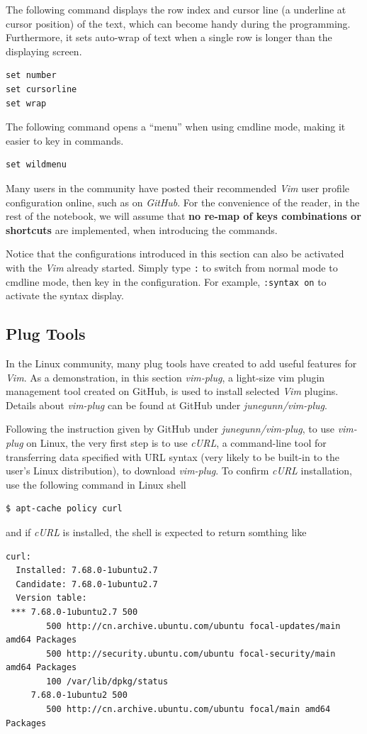 The following command displays the row index and cursor line (a underline at cursor position) of the text, which can become handy during the programming. Furthermore, it sets auto-wrap of text when a single row is longer than the displaying screen.
\begin{lstlisting}
set number
set cursorline
set wrap
\end{lstlisting}

The following command opens a ``menu'' when using cmdline mode, making it easier to key in commands.
\begin{lstlisting}
set wildmenu
\end{lstlisting}

Many users in the community have posted their recommended \textit{Vim} user profile configuration online, such as on \textit{GitHub}. For the convenience of the reader, in the rest of the notebook, we will assume that \textbf{no re-map of keys combinations or shortcuts} are implemented, when introducing the commands.

Notice that the configurations introduced in this section can also be activated with the \textit{Vim} already started. Simply type \verb|:| to switch from normal mode to cmdline mode, then key in the configuration. For example, \verb|:syntax on| to activate the syntax display.

\subsection{Plug Tools}

In the Linux community, many plug tools have created to add useful features for \textit{Vim}. As a demonstration, in this section \textit{vim-plug}, a light-size vim plugin management tool created on GitHub, is used to install selected \textit{Vim} plugins. Details about \textit{vim-plug} can be found at GitHub under \textit{junegunn/vim-plug}.

Following the instruction given by GitHub under \textit{junegunn/vim-plug}, to use \textit{vim-plug} on Linux, the very first step is to use \textit{cURL}, a command-line tool for transferring data specified with URL syntax (very likely to be built-in to the user's Linux distribution), to download \textit{vim-plug}. To confirm \textit{cURL} installation, use the following command in Linux shell
\begin{lstlisting}
$ apt-cache policy curl
\end{lstlisting}
and if \textit{cURL} is installed, the shell is expected to return somthing like
\begin{lstlisting}
curl:
  Installed: 7.68.0-1ubuntu2.7
  Candidate: 7.68.0-1ubuntu2.7
  Version table:
 *** 7.68.0-1ubuntu2.7 500
        500 http://cn.archive.ubuntu.com/ubuntu focal-updates/main amd64 Packages
        500 http://security.ubuntu.com/ubuntu focal-security/main amd64 Packages
        100 /var/lib/dpkg/status
     7.68.0-1ubuntu2 500
        500 http://cn.archive.ubuntu.com/ubuntu focal/main amd64 Packages
\end{lstlisting}

